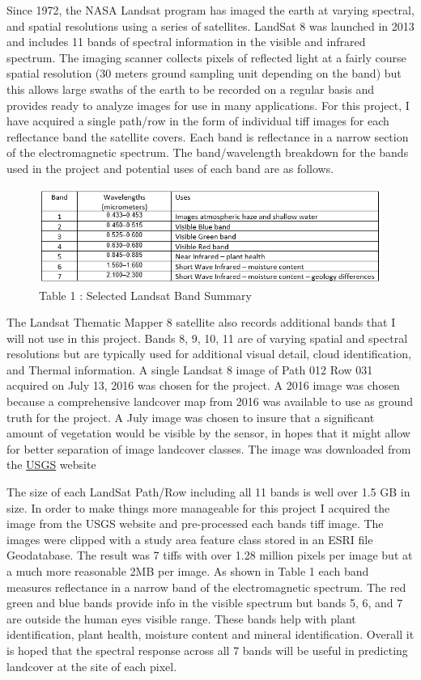 \documentclass[]{article}
\begin{document}
Since 1972, the NASA Landsat program has imaged the earth at varying
spectral, and spatial resolutions using a series of satellites. LandSat
8 was launched in 2013 and includes 11 bands of spectral information in
the visible and infrared spectrum. The imaging scanner collects pixels
of reflected light at a fairly course spatial resolution (30 meters
ground sampling unit depending on the band) but this allows large swaths
of the earth to be recorded on a regular basis and provides ready to
analyze images for use in many applications. For this project, I have
acquired a single path/row in the form of individual tiff images for
each reflectance band the satellite covers. Each band is reflectance in
a narrow section of the electromagnetic spectrum. The band/wavelength
breakdown for the bands used in the project and potential uses of each
band are as follows.

\begin{figure}
\centering
\includegraphics{images/Table1.png}
\caption{Table 1 : Selected Landsat Band Summary}
\end{figure}

The Landsat Thematic Mapper 8 satellite also records additional bands
that I will not use in this project. Bands 8, 9, 10, 11 are of varying
spatial and spectral resolutions but are typically used for additional
visual detail, cloud identification, and Thermal information. A single
Landsat 8 image of Path 012 Row 031 acquired on July 13, 2016 was chosen
for the project. A 2016 image was chosen because a comprehensive
landcover map from 2016 was available to use as ground truth for the
project. A July image was chosen to insure that a significant amount of
vegetation would be visible by the sensor, in hopes that it might allow
for better separation of image landcover classes. The image was
downloaded from the \href{https://earthexplorer.usgs.gov/}{USGS} website

The size of each LandSat Path/Row including all 11 bands is well over
1.5 GB in size. In order to make things more manageable for this project
I acquired the image from the USGS website and pre-processed each bands
tiff image. The images were clipped with a study area feature class
stored in an ESRI file Geodatabase. The result was 7 tiffs with over
1.28 million pixels per image but at a much more reasonable 2MB per
image. As shown in Table 1 each band measures reflectance in a narrow
band of the electromagnetic spectrum. The red green and blue bands
provide info in the visible spectrum but bands 5, 6, and 7 are outside
the human eyes visible range. These bands help with plant
identification, plant health, moisture content and mineral
identification. Overall it is hoped that the spectral response across
all 7 bands will be useful in predicting landcover at the site of each
pixel.
\end{document}
